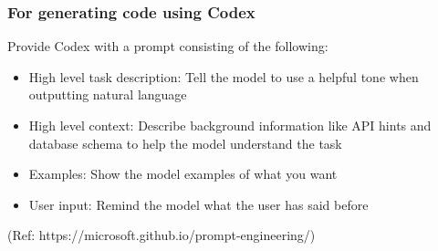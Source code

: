 \begin{frame}[fragile]\frametitle{For generating code using Codex}

Provide Codex with a prompt consisting of the following:



\begin{itemize}
\item  High level task description: Tell the model to use a helpful tone when outputting natural language
\item  High level context: Describe background information like API hints and database schema to help the model understand the task
\item  Examples: Show the model examples of what you want
\item  User input: Remind the model what the user has said before
\end{itemize}	 

{\tiny (Ref: https://microsoft.github.io/prompt-engineering/)}

\end{frame}









